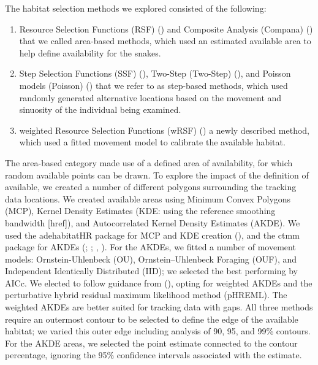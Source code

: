 \documentclass[10pt,a4paper]{article}
\begin{document}
The habitat selection methods we explored consisted of the following:

\begin{enumerate}
\def\labelenumi{\arabic{enumi}.}
\item
  Resource Selection Functions (RSF) () and Composite Analysis (Compana) () that we called area-based methods, which used an estimated available area to help define availability for the snakes.
\item
  Step Selection Functions (SSF) (), Two-Step (Two-Step) (), and Poisson models (Poisson) () that we refer to as step-based methods, which used randomly generated alternative locations based on the movement and sinuosity of the individual being examined.
\item
  weighted Resource Selection Functions (wRSF) () a newly described method, which used a fitted movement model to calibrate the available habitat.
\end{enumerate}

The area-based category made use of a defined area of availability, for which random available points can be drawn.
To explore the impact of the definition of available, we created a number of different polygons surrounding the tracking data locations.
We created available areas using Minimum Convex Polygons (MCP), Kernel Density Estimates (KDE: using the reference smoothing bandwidth {[}href{]}), and Autocorrelated Kernel Density Estimates (AKDE).
We used the adehabitatHR package for MCP and KDE creation (), and the ctmm package for AKDEs (; ; , ).
For the AKDEs, we fitted a number of movement models: Ornstein-Uhlenbeck (OU), Ornstein--Uhlenbeck Foraging (OUF), and Independent Identically Distributed (IID); we selected the best performing by AICc.
We elected to follow guidance from (), opting for weighted AKDEs and the perturbative hybrid residual maximum likelihood method (pHREML).
The weighted AKDEs are better suited for tracking data with gaps.
All three methods require an outermost contour to be selected to define the edge of the available habitat; we varied this outer edge including analysis of 90, 95, and 99\% contours.
For the AKDE areas, we selected the point estimate connected to the contour percentage, ignoring the 95\% confidence intervals associated with the estimate.
\end{document}
